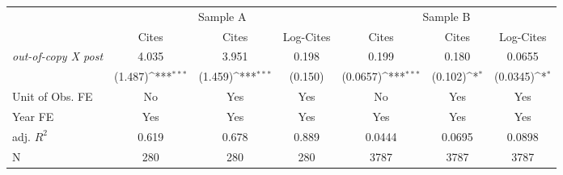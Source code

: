 {
\def\sym#1{\ifmmode^{#1}\else\(^{#1}\)\fi}
\begin{tabular*}{\hsize}{@{\hskip\tabcolsep\extracolsep\fill}l*{6}{c}}
\toprule
            &\multicolumn{3}{c}{Sample A}                                     &\multicolumn{3}{c}{Sample B}                                     \\\cmidrule(lr){2-4}\cmidrule(lr){5-7}
            &\multicolumn{1}{c}{Cites}&\multicolumn{1}{c}{Cites}&\multicolumn{1}{c}{Log-Cites}&\multicolumn{1}{c}{Cites}&\multicolumn{1}{c}{Cites}&\multicolumn{1}{c}{Log-Cites}\\
\midrule
\emph{out-of-copy X post}&       4.035         &       3.951         &       0.198         &       0.199         &       0.180         &      0.0655         \\
            &     (1.487)\sym{***}&     (1.459)\sym{***}&     (0.150)         &    (0.0657)\sym{***}&     (0.102)\sym{*}  &    (0.0345)\sym{*}  \\
\midrule
Unit of Obs. FE&          No         &         Yes         &         Yes         &          No         &         Yes         &         Yes         \\
Year FE     &         Yes         &         Yes         &         Yes         &         Yes         &         Yes         &         Yes         \\
adj. $R^2$  &       0.619         &       0.678         &       0.889         &      0.0444         &      0.0695         &      0.0898         \\
N           &         280         &         280         &         280         &        3787         &        3787         &        3787         \\
\bottomrule
\end{tabular*}
}
